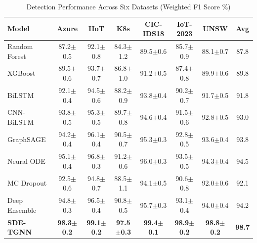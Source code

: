 \documentclass[10pt,journal,compsoc]{IEEEtran}
\begin{document}
\begin{table}[!t]
\centering
\caption{Detection Performance Across Six Datasets (Weighted F1 Score \%)}
\label{tab:detection_performance}
\small
\begin{tabular}{@{}lccccccc@{}}
\toprule
\textbf{Model} & \textbf{Azure} & \textbf{IIoT} & \textbf{K8s} & \textbf{CIC-IDS18} & \textbf{IoT-2023} & \textbf{UNSW} & \textbf{Avg} \\
\midrule
Random Forest & 87.2{\scriptsize$\pm$0.5} & 92.1{\scriptsize$\pm$0.8} & 84.3{\scriptsize$\pm$1.2} & 89.5{\scriptsize$\pm$0.6} & 85.7{\scriptsize$\pm$0.9} & 88.1{\scriptsize$\pm$0.7} & 87.8 \\
XGBoost & 89.5{\scriptsize$\pm$0.6} & 93.7{\scriptsize$\pm$0.7} & 86.8{\scriptsize$\pm$1.0} & 91.2{\scriptsize$\pm$0.5} & 87.4{\scriptsize$\pm$0.8} & 89.9{\scriptsize$\pm$0.6} & 89.8 \\
BiLSTM & 92.1{\scriptsize$\pm$0.4} & 94.5{\scriptsize$\pm$0.6} & 88.2{\scriptsize$\pm$0.9} & 93.8{\scriptsize$\pm$0.4} & 90.2{\scriptsize$\pm$0.7} & 91.7{\scriptsize$\pm$0.5} & 91.8 \\
CNN-BiLSTM & 93.8{\scriptsize$\pm$0.5} & 95.3{\scriptsize$\pm$0.5} & 89.7{\scriptsize$\pm$0.8} & 94.6{\scriptsize$\pm$0.4} & 91.5{\scriptsize$\pm$0.6} & 92.8{\scriptsize$\pm$0.5} & 93.0 \\
GraphSAGE & 94.2{\scriptsize$\pm$0.4} & 96.1{\scriptsize$\pm$0.4} & 90.5{\scriptsize$\pm$0.7} & 95.3{\scriptsize$\pm$0.3} & 92.8{\scriptsize$\pm$0.5} & 93.6{\scriptsize$\pm$0.4} & 93.8 \\
Neural ODE & 95.1{\scriptsize$\pm$0.4} & 96.8{\scriptsize$\pm$0.3} & 91.2{\scriptsize$\pm$0.6} & 96.0{\scriptsize$\pm$0.3} & 93.5{\scriptsize$\pm$0.5} & 94.3{\scriptsize$\pm$0.4} & 94.5 \\
MC Dropout & 92.5{\scriptsize$\pm$0.6} & 94.8{\scriptsize$\pm$0.7} & 88.5{\scriptsize$\pm$1.1} & 94.1{\scriptsize$\pm$0.5} & 90.6{\scriptsize$\pm$0.8} & 92.0{\scriptsize$\pm$0.6} & 92.1 \\
Deep Ensemble & 94.8{\scriptsize$\pm$0.3} & 96.5{\scriptsize$\pm$0.4} & 90.8{\scriptsize$\pm$0.5} & 95.7{\scriptsize$\pm$0.3} & 93.1{\scriptsize$\pm$0.4} & 94.0{\scriptsize$\pm$0.4} & 94.2 \\
\midrule
\textbf{SDE-TGNN} & \textbf{98.3{\scriptsize$\pm$0.2}} & \textbf{99.1{\scriptsize$\pm$0.2}} & \textbf{97.5{\scriptsize$\pm$0.3}} & \textbf{99.4{\scriptsize$\pm$0.1}} & \textbf{98.9{\scriptsize$\pm$0.2}} & \textbf{98.8{\scriptsize$\pm$0.2}} & \textbf{98.7} \\
\bottomrule
\end{tabular}
\end{table}
\end{document}
